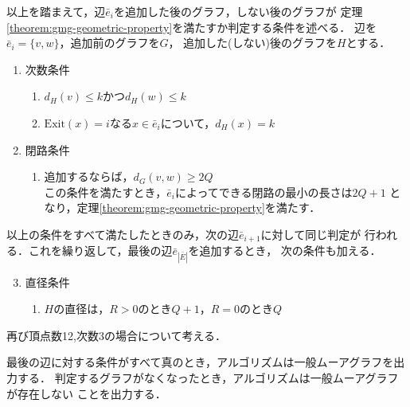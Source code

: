 以上を踏まえて，辺$\bar{e}_i$を追加した後のグラフ，しない後のグラフが
定理\ref{theorem:gmg-geometric-property}を満たすか判定する条件を述べる．
辺を$\bar{e}_i=\{v,w\}$，追加前のグラフを$G$，
追加した(しない)後のグラフを$H$とする．
\begin{enumerate}
\item 次数条件
  \label{item:degree-constraint}
  \begin{enumerate}
  \item $d_H(v)\leq k$かつ$d_H(w)\leq k$
  \item $\mathrm{Exit}(x)=i$なる$x\in\bar{e}_i$について，$d_H(x)=k$
  \end{enumerate}
\item 閉路条件
  \label{item:cycle-constraint}
  \begin{enumerate}
  \item 追加するならば，$d_G(v,w)\geq2Q$\\
    この条件を満たすとき，$\bar{e}_i$によってできる閉路の最小の長さは$2Q+1$
    となり，定理\ref{theorem:gmg-geometric-property}を満たす．
  \end{enumerate}
\end{enumerate}
以上の条件をすべて満たしたときのみ，次の辺$\bar{e}_{i+1}$に対して同じ判定が
行われる．これを繰り返して，最後の辺$\bar{e}_{|\bar{E}|}$を追加するとき，
次の条件も加える．
\begin{enumerate}\setcounter{enumi}{2}
\item 直径条件
  \label{item:diameter-constraint}
  \begin{enumerate}
  \item $H$の直径は，$R>0$のとき$Q+1$，$R=0$のとき$Q$
  \end{enumerate}
\end{enumerate}

\begin{example}
  再び頂点数12,次数3の場合について考える．
\end{example}

最後の辺に対する条件がすべて真のとき，アルゴリズムは一般ムーアグラフを出力する．
判定するグラフがなくなったとき，アルゴリズムは一般ムーアグラフが存在しない
ことを出力する．

